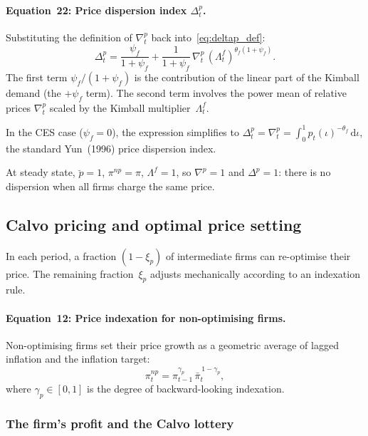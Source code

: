 \documentclass[11pt,a4paper]{article}
\newcommand{\dd}{\mathrm{d}}
\newcommand{\bbar}[1]{\bar{#1}}
\begin{document}
\paragraph{Equation~22: Price dispersion index $\Delta^p_t$.}
Substituting the definition of $\nabla^p_t$ back
into~\eqref{eq:deltap_def}:
\begin{equation}\label{eq:eq22}\tag{Eq.~22}
  \boxed{
  \Delta^p_t = \frac{\psi_f}{1+\psi_f}
  + \frac{1}{1+\psi_f}\,\nabla^p_t\,
    (\Lambda^f_t)^{\theta_f(1+\psi_f)}.}
\end{equation}
The first term $\psi_f/(1+\psi_f)$ is the contribution of the linear
part of the Kimball demand (the $+\psi_f$ term). The second term involves
the power mean of relative prices $\nabla^p_t$ scaled by the Kimball
multiplier~$\Lambda^f_t$.

In the CES case ($\psi_f = 0$), the expression simplifies to
$\Delta^p_t = \nabla^p_t = \int_0^1 p_t(\iota)^{-\theta_f}\,\dd\iota$,
the standard Yun~(1996) price dispersion index.

At steady state, $\breve p=1$, $\pi^{np}=\pi$, $\Lambda^f=1$, so
$\nabla^p = 1$ and $\Delta^p = 1$: there is no dispersion when all
firms charge the same price.

\subsection{Calvo pricing and optimal price setting}

In each period, a fraction $(1-\xi_p)$ of intermediate firms can
re-optimise their price. The remaining fraction~$\xi_p$ adjusts
mechanically according to an indexation rule.

\paragraph{Equation~12: Price indexation for non-optimising firms.}
Non-optimising firms set their price growth as a geometric average of
lagged inflation and the inflation target:
\begin{equation}\label{eq:eq12}\tag{Eq.~12}
  \boxed{
  \pi^{np}_t = \pi_{t-1}^{\gamma_p}\,\bbar\pi_t^{\,1-\gamma_p},}
\end{equation}
where $\gamma_p \in [0,1]$ is the degree of backward-looking indexation.

\subsubsection{The firm's profit and the Calvo lottery}
\end{document}
